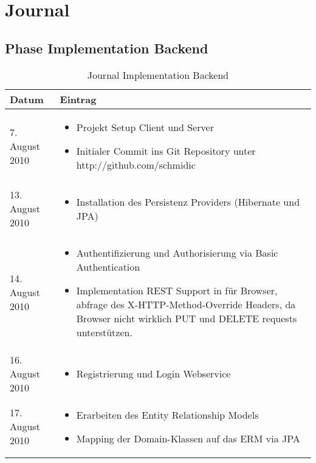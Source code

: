 \chapter{Journal}


\section{Phase Implementation Backend}
\begin{spacing}{0.5}
  \begin{longtable}{|p{4cm}|p{10cm}|}
      \caption{Journal Implementation Backend}\\
\hline
  Datum & Eintrag\\
  \hline
  7. August 2010 & 
  \begin{itemize}
  \item Projekt Setup Client und Server 
  \item Initialer Commit ins Git Repository unter http://github.com/schmidic
  \end{itemize}\\
  \hline

  13. August 2010 & 
  \begin{itemize}
  \item Installation des Persistenz Providers (Hibernate und JPA)
  \end{itemize}\\
  \hline
  
  14. August 2010 & 
  \begin{itemize}
  \item Authentifizierung und Authorisierung via Basic Authentication
  \item Implementation REST Support in f\"ur Browser, abfrage des X-HTTP-Method-Override Headers, da Browser nicht wirklich PUT und DELETE requests unterst\"utzen.
  \end{itemize}\\
  \hline
  
  16. August 2010 & 
  \begin{itemize}
  \item Registrierung und Login Webservice
  \end{itemize}\\
  \hline

  17. August 2010 & 
  \begin{itemize}
  \item Erarbeiten des Entity Relationship Models
  \item Mapping der Domain-Klassen auf das ERM via JPA
  \end{itemize}\\
  \hline
  

\end{longtable}
\end{spacing}
